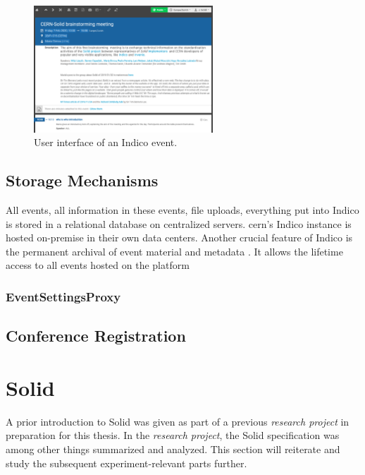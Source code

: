 \begin{figure}[H]
    \centering
    \includegraphics[width=0.6\textwidth]{thesis/latex/assets/indico-event-interface.png}
    \caption{User interface of an Indico event.}
    \label{fig:indico-event-interface}
\end{figure} 

\subsection{Storage Mechanisms}

All events, all information in these events, file uploads, everything put into Indico is stored in a relational database on centralized servers. \gls{cern}'s Indico instance is hosted on-premise in their own data centers. Another crucial feature of Indico is the permanent archival of event material and metadata \cite{cern-indico}. It allows the lifetime access to all events hosted on the platform



\subsubsection{EventSettingsProxy}

\subsection{Conference Registration}

\section{Solid}

A prior introduction to Solid was given as part of a previous \textit{research project} \cite{cern-solid-investigation-spec} in preparation for this thesis. In the \textit{research project}, the Solid specification was among other things summarized and analyzed. This section will reiterate and study the subsequent experiment-relevant parts further.

